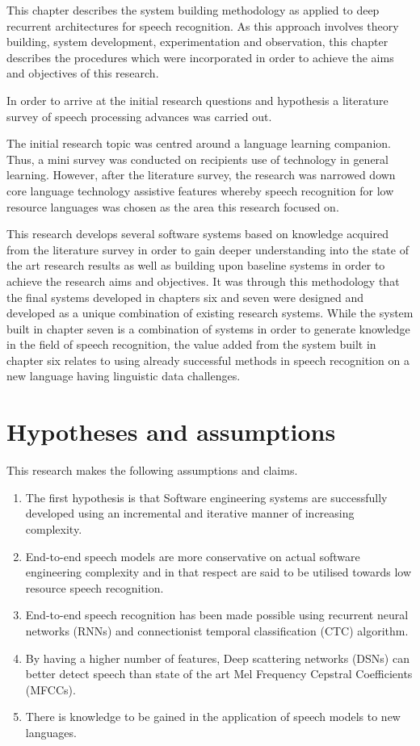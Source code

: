 This chapter describes the system building methodology  \citep{nunamaker1990systems} as applied to deep recurrent architectures for speech recognition.  As this approach involves theory building, system development, experimentation and observation, this chapter describes the procedures which were incorporated in order to achieve the aims and objectives of this research.

In order to arrive at the initial research questions and hypothesis a literature survey  of speech processing advances was carried out.  

The initial research topic was centred around a language learning companion.  Thus, a mini survey was conducted on recipients use of technology in general learning.  However, after the literature survey, the research was narrowed down core language technology assistive features whereby speech recognition for low resource languages was chosen as the area this research focused on.

This research develops several software systems based on knowledge acquired from the literature survey in order to gain deeper understanding into the state of the art research results as well as building upon baseline systems in order to achieve the research aims and objectives.  It was through this methodology that the final systems developed in chapters six and seven were designed and developed as a unique combination of existing research systems.  While the system built in chapter seven is a combination of systems in order to generate knowledge in the field of speech recognition, the value added from the system built in chapter six relates to using already successful methods in speech recognition on a new language having linguistic data challenges. 
\section{Hypotheses and assumptions}
This research makes the following assumptions and claims.
\begin{enumerate}
    \item The first hypothesis is that Software engineering systems are successfully developed using an incremental and iterative manner of increasing complexity.
    \item End-to-end speech models are more conservative on actual software engineering complexity and in that respect are said to be utilised towards low resource speech recognition.
    \item End-to-end speech recognition has been made possible using recurrent neural networks (RNNs) and connectionist temporal classification (CTC) algorithm.
    \item By having a higher number of features, Deep scattering networks (DSNs) can better detect speech than state of the art Mel Frequency Cepstral Coefficients (MFCCs).
    \item There is knowledge to be gained in the application of speech models to new languages.
\end{enumerate}

